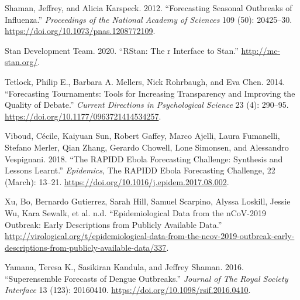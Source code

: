 \documentclass[
]{article}
\newlength{\cslhangindent}
\newlength{\cslentryspacingunit} %
\newenvironment{CSLReferences}[2] %
 {%
  \setlength{\parindent}{0pt}
  \ifodd #1
  \let\oldpar\par
  \def\par{\hangindent=\cslhangindent\oldpar}
  \fi
  \setlength{\parskip}{#2\cslentryspacingunit}
 }%
 {}
\begin{document}
\begin{CSLReferences}{1}{0}
\leavevmode{}%
Shaman, Jeffrey, and Alicia Karspeck. 2012. {``Forecasting Seasonal Outbreaks of Influenza.''} \emph{Proceedings of the National Academy of Sciences} 109 (50): 20425--30. \url{https://doi.org/10.1073/pnas.1208772109}.

\leavevmode{}%
Stan Development Team. 2020. {``RStan: The r Interface to Stan.''} \url{http://mc-stan.org/}.

\leavevmode{}%
Tetlock, Philip E., Barbara A. Mellers, Nick Rohrbaugh, and Eva Chen. 2014. {``Forecasting {Tournaments}: Tools for {Increasing Transparency} and {Improving} the {Quality} of {Debate}.''} \emph{Current Directions in Psychological Science} 23 (4): 290--95. \url{https://doi.org/10.1177/0963721414534257}.

\leavevmode{}%
Viboud, Cécile, Kaiyuan Sun, Robert Gaffey, Marco Ajelli, Laura Fumanelli, Stefano Merler, Qian Zhang, Gerardo Chowell, Lone Simonsen, and Alessandro Vespignani. 2018. {``The {RAPIDD} Ebola Forecasting Challenge: Synthesis and Lessons Learnt.''} \emph{Epidemics}, The {RAPIDD Ebola Forecasting Challenge}, 22 (March): 13--21. \url{https://doi.org/10.1016/j.epidem.2017.08.002}.

\leavevmode{}%
Xu, Bo, Bernardo Gutierrez, Sarah Hill, Samuel Scarpino, Alyssa Loskill, Jessie Wu, Kara Sewalk, et al. n.d. {``Epidemiological Data from the nCoV-2019 Outbreak: Early Descriptions from Publicly Available Data.''} \url{http://virological.org/t/epidemiological-data-from-the-ncov-2019-outbreak-early-descriptions-from-publicly-available-data/337}.

\leavevmode{}%
Yamana, Teresa K., Sasikiran Kandula, and Jeffrey Shaman. 2016. {``Superensemble Forecasts of Dengue Outbreaks.''} \emph{Journal of The Royal Society Interface} 13 (123): 20160410. \url{https://doi.org/10.1098/rsif.2016.0410}.

\end{CSLReferences}
\end{document}
